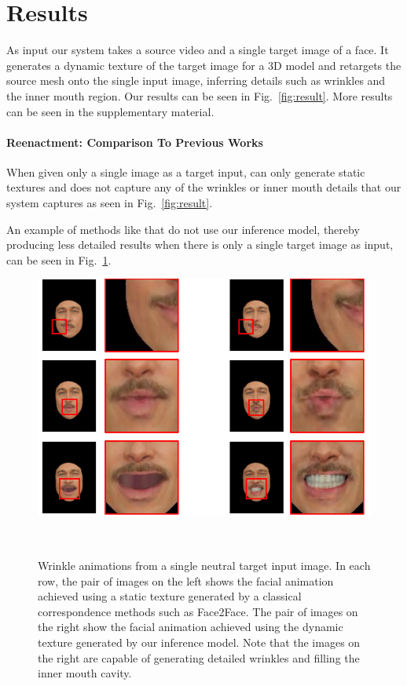 \section{Results}

As input our system takes a source video and a single target image of a face. It generates a dynamic texture of the target image for a 3D model and retargets the source mesh onto the single input image, inferring details such as wrinkles and the inner mouth region.  Our results can be seen in Fig.~\ref{fig:result}. More results can be seen in the supplementary material.


\paragraph{Reenactment: Comparison To Previous Works}

When given only a single image as a target input, \cite{f2f} can only generate static textures and does not capture any of the wrinkles or inner mouth details that our system captures as seen in Fig.~\ref{fig:result}. 

An example of methods like \cite{f2f} that do not use our inference model, thereby producing less detailed results when there is only a single target image as input, can be seen in Fig.~\ref{fig:wrinkles}.


\begin{figure}[th]
	\centering
	\includegraphics[width=1.0\linewidth]{figures/wrinkles/example_crop.png}
	\caption{Wrinkle animations from a single neutral target input image. In each row, the pair of images on the left shows the facial animation achieved using a static texture generated by a classical correspondence methods such as Face2Face. The pair of images on the right show the facial animation achieved using the dynamic texture generated by our inference model. Note that the images on the right are capable of generating detailed wrinkles and filling the inner mouth cavity.}~\label{fig:wrinkles}
	\vspace{-0.2in}
\end{figure}

